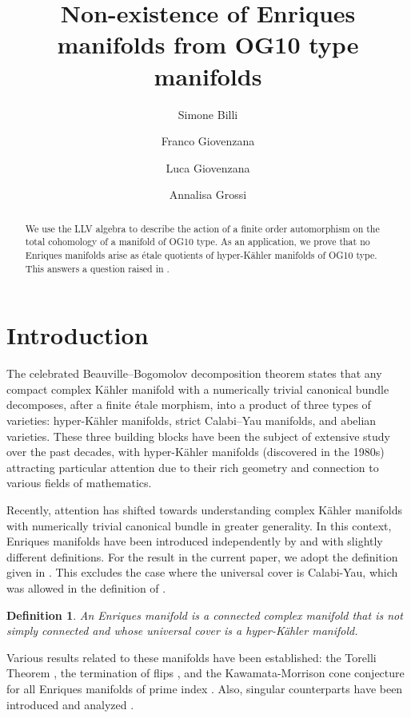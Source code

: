 \documentclass[a4paper,11pt]{amsart}
\title{Non-existence of Enriques manifolds from OG10 type manifolds}
\author[S.Billi]{Simone Billi}
\author[F.Giovenzana]{Franco Giovenzana}
\author[L. Giovenzana]{Luca Giovenzana}
\author[A.Grossi]{Annalisa Grossi}
\theoremstyle{plain}
\newtheorem{definition}[satz]{Definition}
\theoremstyle{remark}
\begin{document}
\begin{abstract}
We use the LLV algebra to describe the action of a finite order automorphism on the total cohomology of a manifold of OG10 type.
As an application, we prove that no Enriques manifolds arise as étale quotients of hyper-Kähler manifolds of OG10 type. This answers a question raised in \cite{Pacienza_Sarti}.
\end{abstract}


\maketitle

\section{Introduction}

The celebrated Beauville–Bogomolov decomposition theorem states that any compact complex Kähler manifold with a numerically trivial canonical bundle decomposes, after a finite étale morphism, into a product of three types of varieties: hyper-Kähler manifolds, strict Calabi–Yau manifolds, and abelian varieties. These three building blocks have been the subject of extensive study over the past decades, with hyper-Kähler manifolds (discovered in the 1980s) attracting particular attention due to their rich geometry and connection to various fields of mathematics.

Recently, attention has shifted towards understanding complex Kähler manifolds with numerically trivial canonical bundle in greater generality. In this context, Enriques manifolds have been introduced independently by \cite{BN-WS} and \cite{OS} with slightly different definitions.
For the result in the current paper, we adopt the definition given in \cite{OS}. This excludes the case where the universal cover is Calabi-Yau, which was allowed in the definition of \cite{Boissiere.NieperWisskirchen.Sarti:enriques.varieties}.
\begin{definition}\label{def_enr_man}
An Enriques manifold is a connected complex manifold that is not simply connected and whose universal cover is a hyper-Kähler manifold.
\end{definition}
Various results related to these manifolds have been established: 
the Torelli Theorem \cite{OS_periods, raman2024}, the termination of flips \cite{denisi2024mmp}, and the Kawamata-Morrison cone conjecture for all Enriques manifolds of prime index \cite{Pacienza_Sarti}. Also, singular counterparts have been introduced and analyzed \cite{boissiere2024logarithmic, denisi2024mmp}.
\end{document}
